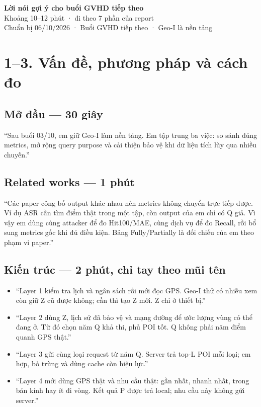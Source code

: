 \documentclass[11pt,a4paper]{article}
\begin{document}
\begin{center}{\LARGE\bfseries\color{ink}Lời nói gợi ý cho buổi GVHD tiếp theo}\\[5pt]{\large Khoảng 10–12 phút · đi theo 7 phần của report}\\[4pt]{\small Chuẩn bị 06/10/2026 · Buổi GVHD tiếp theo · Geo-I là nền tảng}\end{center}
\section*{1–3. Vấn đề, phương pháp và cách đo}
\subsection*{Mở đầu — 30 giây}
“Sau buổi 03/10, em giữ Geo-I làm nền tảng. Em tập trung ba việc: so sánh đúng metrics, mở rộng query purpose và cải thiện bảo vệ khi dữ liệu tích lũy qua nhiều chuyến.”

\subsection*{Related works — 1 phút}
“Các paper công bố output khác nhau nên metrics không chuyển trực tiếp được. Ví dụ ASR cần tìm điểm thật trong một tập, còn output của em chỉ có Q giả. Vì vậy em dùng cùng attacker để đo Hit100/MAE, cùng dịch vụ để đo Recall, rồi bổ sung metrics gốc khi đủ điều kiện. Bảng Fully/Partially là đối chiếu của em theo phạm vi paper.”

\subsection*{Kiến trúc — 2 phút, chỉ tay theo mũi tên}
\begin{itemize}
\item “Layer 1 kiểm tra lịch và ngân sách rồi mới đọc GPS. Geo-I thử có nhiễu xem còn giữ Z cũ được không; cần thì tạo Z mới. Z chỉ ở thiết bị.”
\item “Layer 2 dùng Z, lịch sử đã bảo vệ và mạng đường để ước lượng vùng có thể đang ở. Từ đó chọn năm Q khả thi, phủ POI tốt. Q không phải năm điểm quanh GPS thật.”
\item “Layer 3 gửi cùng loại request từ năm Q. Server trả top-L POI mỗi loại; em hợp, bỏ trùng và dùng cache còn hiệu lực.”
\item “Layer 4 mới dùng GPS thật và nhu cầu thật: gần nhất, nhanh nhất, trong bán kính hay ít đi vòng. Kết quả P được trả local; nhu cầu này không gửi server.”
\end{itemize}
\end{document}
